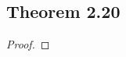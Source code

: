 \documentclass[../../main.tex]{subfiles}
\begin{document}
\subsection{Theorem 2.20}
\begin{wts}

\end{wts}
\begin{proof}

\end{proof}
\end{document}
